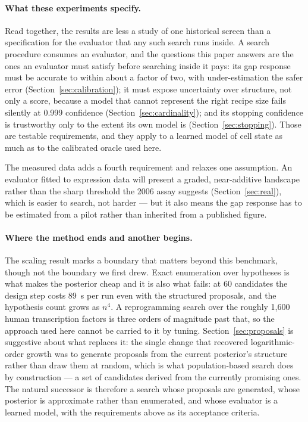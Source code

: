\documentclass[11pt]{article}
\begin{document}
\paragraph{What these experiments specify.} Read together, the results are less
a study of one historical screen than a specification for the evaluator that any
such search runs inside. A search procedure consumes an evaluator, and the
questions this paper answers are the ones an evaluator must satisfy before
searching inside it pays: its gap response must be accurate to within about a
factor of two, with under-estimation the safer error
(Section~\ref{sec:calibration}); it must expose uncertainty over structure, not
only a score, because a model that cannot represent the right recipe size fails
silently at 0.999 confidence (Section~\ref{sec:cardinality}); and its stopping
confidence is trustworthy only to the extent its own model is
(Section~\ref{sec:stopping}). Those are testable requirements, and they apply to
a learned model of cell state as much as to the calibrated oracle used here.

The measured data adds a fourth requirement and relaxes one assumption. An
evaluator fitted to expression data will present a graded, near-additive
landscape rather than the sharp threshold the 2006 assay suggests
(Section~\ref{sec:real}), which is easier to search, not harder --- but it also
means the gap response has to be estimated from a pilot rather than inherited
from a published figure.

\paragraph{Where the method ends and another begins.} The scaling result marks
a boundary that matters beyond this benchmark, though not the boundary we
first drew. Exact enumeration over hypotheses is what makes the posterior cheap
and it is also what fails: at 60 candidates the design step costs 89~s per run
even with the structured proposals, and the hypothesis count grows as $n^4$. A
reprogramming search over the roughly 1{,}600 human transcription factors is
three orders of magnitude past that, so the approach used here cannot be
carried to it by tuning. Section~\ref{sec:proposals} is suggestive about what
replaces it: the single change that recovered logarithmic-order growth was to
generate proposals from the current posterior's structure rather than draw them
at random, which is what population-based search does by construction --- a set
of candidates derived from the currently promising ones. The natural successor
is therefore a search whose proposals are generated, whose posterior is
approximate rather than enumerated, and whose evaluator is a learned model,
with the requirements above as its acceptance criteria.
\end{document}
